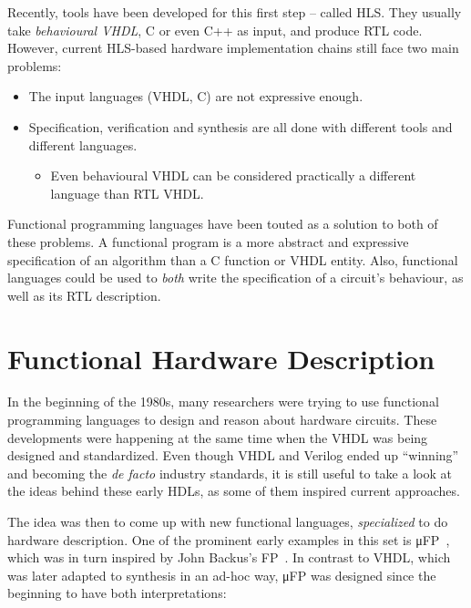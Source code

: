         Recently, tools have been developed for this first step -- called \ac{HLS}.
        They usually take \emph{behavioural \acs{VHDL}}, C or even C++ as input, and produce \ac{RTL} code.
        However, current \acs{HLS}-based hardware implementation chains still face two main problems:

        \begin{itemize}
            \item The input languages (VHDL, C) are not expressive enough.
            \item Specification, verification and synthesis are all done with different tools and different languages.
            \begin{itemize}
                \item Even behavioural \acs{VHDL} can be considered practically a different language
                    than \acl{RTL} \acs{VHDL}.
            \end{itemize}
        \end{itemize}

        Functional programming languages have been touted as a solution to both of these problems.
        A functional program is a more abstract and expressive specification of an algorithm than
        a C function or VHDL entity.
        Also, functional languages could be used to \emph{both} write the specification of a circuit's behaviour,
        as well as its \acl{RTL} description.


    \section{Functional Hardware Description}
    \label{sec:functional-hardware}
        In the beginning of the 1980s, many researchers were trying to use functional programming languages
        to design and reason about hardware circuits.
        These developments were happening at the same time when the \ac{VHDL} was being designed and standardized.
        Even though \ac{VHDL} and Verilog ended up ``winning'' and becoming the \emph{de facto} industry standards,
        it is still useful to take a look at the ideas behind these early \acp{HDL}, as some of them
        inspired current approaches.

        The idea was then to come up with new functional languages, \emph{specialized} to do hardware description.
        One of the prominent early examples in this set is μFP~\cite{mufp-1984},
        which was in turn inspired by John Backus's FP~\cite{backus-turing-lecture}.
        In contrast to \ac{VHDL}, which was later adapted to synthesis in an ad-hoc way,
        μFP was designed since the beginning to have both interpretations:

